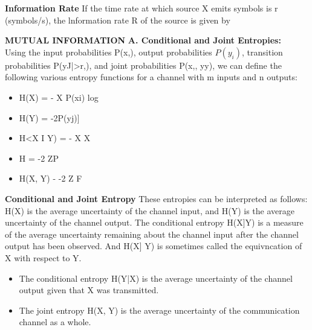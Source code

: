 \documentclass[a4]{beamer}
\begin{document}




\medskip
\noindent \textbf{Information Rate}
If the time rate at which source X emits symbols is r (symbols/s), the lnformation rate R of the
source is given by









\medskip
\noindent \textbf{ MUTUAL INFORMATION}
\textbf{A. Conditional and Joint Entropies:}\\
Using the input probabilities P(x,), output probabilities $P(y_i)$, transition probabilities P(yJ|>r,),
and joint probabilities P(x,, yy), we can define the following various entropy functions for a channel
with m inputs and n outputs:
 
\begin{itemize}
\item H(X) = - X P(xi) log %
\item H(Y) = -2P(yj)]%
\item H<X I Y) = - X X %
\item H = -2 ZP%
\item H(X, Y) - -2 Z F%
\end{itemize}


\medskip
\noindent \textbf{Conditional and Joint Entropy}
These entropies can be interpreted as follows: H(X) is the average uncertainty of the channel input,
and H(Y) is the average uncertainty of the channel output. The conditional entropy H(X]Y) is a
measure of the average uncertainty remaining about the channel input after the channel output has
been observed. And H(X] Y) is sometimes called the equivncation of X with respect to Y. \begin{itemize} \item The
conditional entropy H(Y|X) is the average uncertainty of the channel output given that X was
transmitted.\item  The joint entropy H(X, Y) is the average uncertainty of the communication channel as a
whole.\end{itemize}
\end{document}
